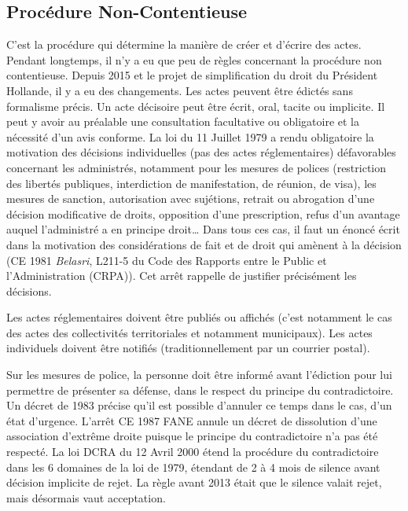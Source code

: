 \documentclass[math]{cours}
\begin{document}
\subsection{Procédure Non-Contentieuse}
C'est la procédure qui détermine la manière de créer et d'écrire des actes.
Pendant longtemps, il n'y a eu que peu de règles concernant la procédure non contentieuse.
Depuis 2015 et le projet de simplification du droit du Président Hollande, il y a eu des changements.
Les actes peuvent être édictés sans formalisme précis. Un acte décisoire peut être écrit, oral, tacite ou implicite.
Il peut y avoir au préalable une consultation facultative ou obligatoire et la nécessité d'un avis conforme.
La loi du 11 Juillet 1979 a rendu obligatoire la motivation des décisions individuelles (pas des actes réglementaires) défavorables concernant les administrés, notamment pour les mesures de polices (restriction des libertés publiques, interdiction de manifestation, de réunion, de visa), les mesures de sanction, autorisation avec sujétions, retrait ou abrogation d'une décision modificative de droits, opposition d'une prescription, refus d'un avantage auquel l'administré a en principe droit\ldots
Dans tous ces cas, il faut un énoncé écrit dans la motivation des considérations de fait et de droit qui amènent à la décision (CE 1981 \emph{Belasri}, L211-5 du Code des Rapports entre le Public et l'Administration (CRPA)).
Cet arrêt rappelle de justifier précisément les décisions.

Les actes réglementaires doivent être publiés ou affichés (c'est notamment le cas des actes des collectivités territoriales et notamment municipaux).
Les actes individuels doivent être notifiés (traditionnellement par un courrier postal).

Sur les mesures de police, la personne doit être informé avant l'édiction pour lui permettre de présenter sa défense, dans le respect du principe du contradictoire.
Un décret de 1983 précise qu'il est possible d'annuler ce temps dans le cas, d'un état d'urgence.
L'arrêt CE 1987 FANE annule un décret de dissolution d'une association d'extrême droite puisque le principe du contradictoire n'a pas été respecté.
La loi DCRA du 12 Avril 2000 étend la procédure du contradictoire dans les 6 domaines de la loi de 1979, étendant de 2 à 4 mois de silence avant décision implicite de rejet.
La règle avant 2013 était que le silence valait rejet, mais désormais vaut acceptation.
\end{document}

